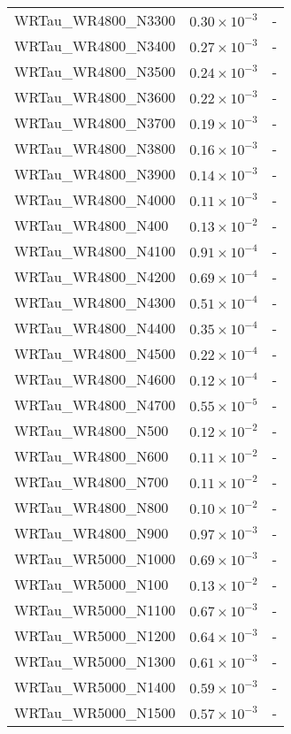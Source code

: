\begin{longtable}[c]{| C{.35\textwidth} | C{.15\textwidth} | C{.1\textwidth}|}
    WRTau\_WR4800\_N3300 & $0.30\times10^{-3}$ & - \\
    WRTau\_WR4800\_N3400 & $0.27\times10^{-3}$ & - \\
    WRTau\_WR4800\_N3500 & $0.24\times10^{-3}$ & - \\
    WRTau\_WR4800\_N3600 & $0.22\times10^{-3}$ & - \\
    WRTau\_WR4800\_N3700 & $0.19\times10^{-3}$ & - \\
    WRTau\_WR4800\_N3800 & $0.16\times10^{-3}$ & - \\
    WRTau\_WR4800\_N3900 & $0.14\times10^{-3}$ & - \\
    WRTau\_WR4800\_N4000 & $0.11\times10^{-3}$ & - \\
    WRTau\_WR4800\_N400 & $0.13\times10^{-2}$ & - \\
    WRTau\_WR4800\_N4100 & $0.91\times10^{-4}$ & - \\
    WRTau\_WR4800\_N4200 & $0.69\times10^{-4}$ & - \\
    WRTau\_WR4800\_N4300 & $0.51\times10^{-4}$ & - \\
    WRTau\_WR4800\_N4400 & $0.35\times10^{-4}$ & - \\
    WRTau\_WR4800\_N4500 & $0.22\times10^{-4}$ & - \\
    WRTau\_WR4800\_N4600 & $0.12\times10^{-4}$ & - \\
    WRTau\_WR4800\_N4700 & $0.55\times10^{-5}$ & - \\
    WRTau\_WR4800\_N500 & $0.12\times10^{-2}$ & - \\
    WRTau\_WR4800\_N600 & $0.11\times10^{-2}$ & - \\
    WRTau\_WR4800\_N700 & $0.11\times10^{-2}$ & - \\
    WRTau\_WR4800\_N800 & $0.10\times10^{-2}$ & - \\
    WRTau\_WR4800\_N900 & $0.97\times10^{-3}$ & - \\
    WRTau\_WR5000\_N1000 & $0.69\times10^{-3}$ & - \\
    WRTau\_WR5000\_N100 & $0.13\times10^{-2}$ & - \\
    WRTau\_WR5000\_N1100 & $0.67\times10^{-3}$ & - \\
    WRTau\_WR5000\_N1200 & $0.64\times10^{-3}$ & - \\
    WRTau\_WR5000\_N1300 & $0.61\times10^{-3}$ & - \\
    WRTau\_WR5000\_N1400 & $0.59\times10^{-3}$ & - \\
    WRTau\_WR5000\_N1500 & $0.57\times10^{-3}$ & - \\

\end{longtable}
